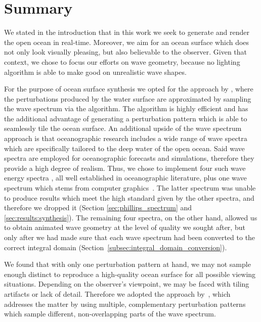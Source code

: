 \chapter{Summary}
\label{ch:summary}

We stated in the introduction that in this work we seek to generate and render the
open ocean in real-time. Moreover, we aim for an ocean surface which does not only
look visually pleasing, but also believable to the observer. Given that context,
we chose to focus our efforts on wave geometry, because no lighting algorithm
is able to make good on unrealistic wave shapes.

For the purpose of ocean surface synthesis we opted for the approach by
\citet{course:simulatingocean}, where the perturbations produced
by the water surface are approximated by sampling the wave spectrum via
the \FastFourierTransform algorithm. The \FFT algorithm is highly
efficient and has the additional advantage of generating a perturbation
pattern which is able to seamlessly tile the ocean surface.
An additional upside of the wave spectrum approach is that oceanographic
research includes a wide range of wave spectra which are specifically
tailored to the deep water of the open ocean. Said wave spectra are
employed for oceanographic forecasts and simulations, therefore they
provide a high degree of realism.
Thus, we chose to implement four such wave energy spectra
\citep{article:PiersonMoskowitz1964, article:Hasselman1973, article:Donelan1985, article:Elfouhaily1997},
all well established in oceanographic literature, plus one wave
spectrum which stems from computer graphics~\citep{course:simulatingocean}.
The latter spectrum was unable to produce results which meet the high
standard given by the other spectra, and therefore we dropped it
(Section \ref{sec:phillips_spectrum} and \ref{sec:results:synthesis}).
The remaining four spectra, on the other hand, allowed us to obtain
animated wave geometry at the level of quality we sought after,
but only after we had made sure that each wave spectrum had been converted
to the correct integral domain (Section~\ref{subsec:integral_domain_conversion}).
%

We found that with only one perturbation pattern at hand, we may not
sample enough distinct \wavenumbers to reproduce a high-quality ocean
surface for all possible viewing situations. Depending on the
observer's viewpoint, we may be faced with tiling artifacts or lack
of detail. Therefore we adopted the approach by~\citet{misc:oceanlightingfft},
which addresses the matter by using multiple, complementary perturbation
patterns which sample different, non-overlapping parts of the wave spectrum.

